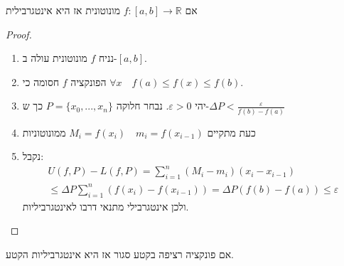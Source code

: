\documentclass{tstextbook}
\begin{document}
\begin{proposition}
אם \(f:[a,b]\rightarrow \mathbb R\) מונוטונית אז היא אינטגרבילית

\end{proposition}
\begin{proof}
  \begin{enumerate}
    \item נניח \(f\) מונוטונית עולה ב-\([a,b]\). 


    \item הפונקציה \(f\) חסומה כי \(\forall x \quad f(a)\leq f(x)\leq f(b)\). 


    \item יהי \(\varepsilon>0\). נבחר חלוקה \(P=\{x_0,...,x_n\}\) כך ש-\(\Delta P < \frac{\varepsilon}{f(b)-f(a)}\)


    \item כעת מתקיים \(M_i=f(x_i)\quad m_i=f(x_{i-1})\) ממונוטוניות 


    \item נקבל:\\
$$\begin{gather}U(f,P)-L(f,P)=\sum_{i=1}^n (M_i-m_i)(x_i-x_{i-1})  \\\leq\Delta P\sum_{i=1}^n (f(x_i)-f(x_{i-1}))=\Delta P(f(b)-f(a))\leq \varepsilon
\end{gather}$$
ולכן אינטגרבילי מתנאי דרבו לאינטגרביליות.


  \end{enumerate}
\end{proof}
\begin{proposition}
אם פונקציה רציפה בקטע סגור אז היא אינטגרביליות הקטע.

\end{proposition}
\end{document}
